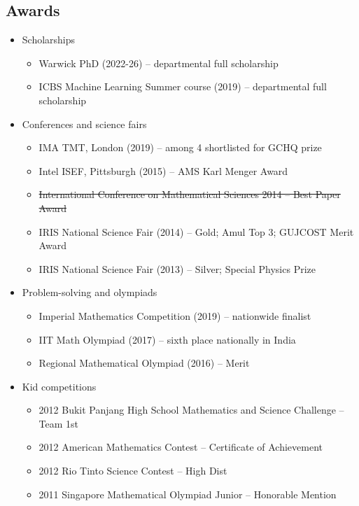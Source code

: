 \documentclass{article}
\newcommand{\disown}[1]{\sout{#1}}
\newcommand{\archive}{\color{lightgray}}
\begin{document}
{\archive

\subsection*{Awards}

\begin{itemize}
    \item Scholarships
    \begin{itemize}
        \item Warwick PhD (2022-26) -- departmental full scholarship
        \item ICBS Machine Learning Summer course (2019) -- departmental full scholarship
    \end{itemize}
    \item Conferences and science fairs
    \begin{itemize}
        \item IMA TMT, London (2019) -- among 4 shortlisted for GCHQ prize
        \item Intel ISEF, Pittsburgh (2015) -- AMS Karl Menger Award
        \item \disown{International Conference on Mathematical Sciences 2014 -- Best Paper Award}
        \item IRIS National Science Fair (2014) -- Gold; Amul Top 3; GUJCOST Merit Award
        \item IRIS National Science Fair (2013) -- Silver; Special Physics Prize
    \end{itemize}
    \item Problem-solving and olympiads
    \begin{itemize}
        \item Imperial Mathematics Competition (2019) -- nationwide finalist
        \item IIT Math Olympiad (2017) -- sixth place nationally in India
        \item Regional Mathematical Olympiad (2016) -- Merit
    \end{itemize}
    \item Kid competitions
    \begin{itemize}
        \item 2012 Bukit Panjang High School Mathematics and Science Challenge -- Team 1st
        \item 2012 American Mathematics Contest -- Certificate of Achievement
        \item 2012 Rio Tinto Science Contest -- High Dist
        \item 2011 Singapore Mathematical Olympiad Junior -- Honorable Mention

\end{itemize}
\end{itemize}}
\end{document}

